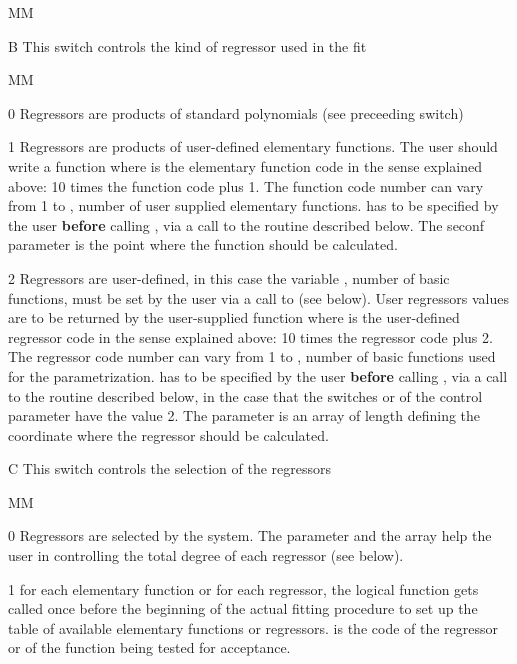\begin{DLtt}{MM}
\item[B] This switch controls the kind of regressor used
in the fit
\begin{DLtt}{MM}
\item[0] Regressors are products of standard polynomials
(see preceeding switch)
\item[1] Regressors are products of user-defined elementary functions.
The user should write a  function 
 where
 is the elementary function code in the sense explained above:
10 times the function code plus 1.
The function code number can vary from 1 to ,
number of user supplied elementary functions.
 has to be specified by the user {\bf before} calling
, via a call to the routine  described below.
The seconf parameter  is the point where the function should be calculated.
\item[2] Regressors are user-defined, in this case the variable
, number of basic functions, must be set by the user via
a call to  (see below).
User regressors values are to be returned by the
user-supplied  function 
where
 is the user-defined regressor code in the sense explained above:
10 times the regressor code plus 2.
The regressor code number can vary from 1 to
, number of basic functions used for the parametrization.
 has to be specified by the user {\bf before} calling
, via a call to the routine   described below,
in the case that the switches  or  of the
control parameter  have the value 2.
The parameter  is an array of length  defining the
coordinate where the regressor should be calculated.
\end{DLtt}
\item[C] This switch controls the selection of the regressors
\begin{DLtt}{MM}
\item[0] Regressors are selected by the system. The parameter
 and the array  help the user in controlling
the total degree of each regressor (see below).
\item[1] for each elementary function or for each regressor,
the logical function 
gets called once before the
beginning of the actual fitting procedure to set up the table of
available elementary functions or regressors.  is
the code of the regressor or of the function being tested for acceptance.

\end{DLtt}
\end{DLtt}
